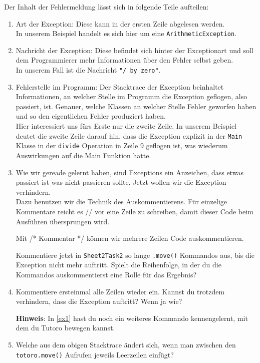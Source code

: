 \begin{Infobox}[Exception]
    Der Inhalt der Fehlermeldung lässt sich in folgende Teile aufteilen:

\begin{enumerate}[label=\roman*)]
\item Art der Exception: Diese kann in der ersten Zeile abgelesen werden.\\
In unserem Beispiel handelt es sich hier um eine \lstinline{ArithmeticException}.
\item Nachricht der Exception: Diese befindet sich hinter der Exceptionart und soll dem Programmierer  mehr Informationen über den Fehler selbst geben.\\
In unserem Fall ist die Nachricht \lstinline{"/ by zero"}.
\item Fehlerstelle im Programm: Der Stacktrace der Exception beinhaltet Informationen, an welcher Stelle im Programm die Exception geflogen, also passiert, ist. 
Genauer, welche Klassen an welcher Stelle Fehler geworfen haben und so den eigentlichen Fehler produziert haben.\\
Hier interessiert uns fürs Erste nur die zweite Zeile. 
In unserem Beispiel deutet die zweite Zeile darauf hin, dass die Exception explizit in der \lstinline{Main} Klasse in der \lstinline{divide}
Operation in Zeile 9 geflogen ist, was wiederum Auswirkungen auf die Main Funktion hatte.
    \end{enumerate}

\end{Infobox}


\begin{enumerate}[label=\alph*)] \setcounter{enumi}{2}

    \item Wie wir gereade gelernt haben, sind Exceptions ein Anzeichen, dass etwas passiert ist was nicht passieren sollte. 
    Jetzt wollen wir die Exception verhindern.\\
Dazu benutzen wir die Technik des Auskommentierens. 
Für einzelige Kommentare reicht es // vor eine Zeile zu schreiben, damit dieser Code beim Ausführen übersprungen wird.

Mit /* Kommentar */ können wir mehrere Zeilen Code auskommentieren.

Kommentiere jetzt  in \lstinline{Sheet2Task2} so lange \lstinline{.move()} Kommandos aus, bis die Exception nicht mehr auftritt.
Spielt die Reihenfolge, in der du die Kommandos auskommentierst eine Rolle für das Ergebnis?

\item Kommentiere ersteinmal alle Zeilen wieder ein.
Kannst du trotzdem verhindern, dass die Exception auftritt?
Wenn ja wie?

\textbf{Hinweis}: In \ref{ex1} hast du noch ein weiteres Kommando kennengelernt, mit dem du Tutoro bewegen kannst.

\item \optional Welche  aus dem obigen Stacktrace ändert sich, wenn man zwischen den \lstinline{totoro.move()} Aufrufen jeweils Leerzeilen einfügt?
\end{enumerate}
 
